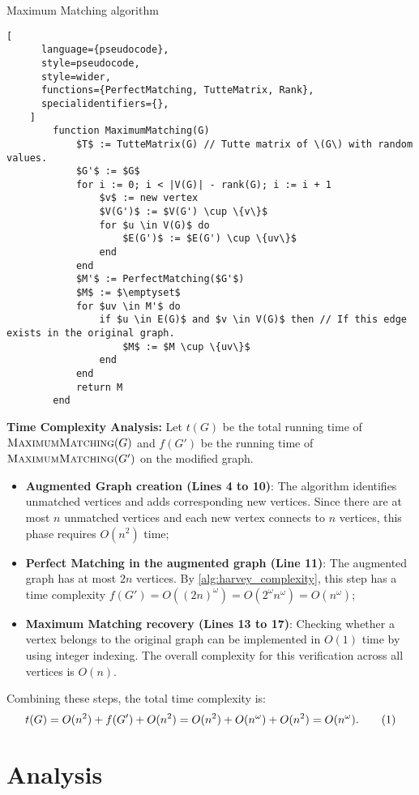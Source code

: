 \begin{programruledcaption}{Maximum Matching algorithm}
    \begin{lstlisting}[
      language={pseudocode},
      style=pseudocode,
      style=wider,
      functions={PerfectMatching, TutteMatrix, Rank},
      specialidentifiers={},
    ]
        function MaximumMatching(G)
            $T$ := TutteMatrix(G) // Tutte matrix of \(G\) with random values.
            $G'$ := $G$
            for i := 0; i < |V(G)| - rank(G); i := i + 1 
                $v$ := new vertex
                $V(G')$ := $V(G') \cup \{v\}$
                for $u \in V(G)$ do 
                    $E(G')$ := $E(G') \cup \{uv\}$
                end
            end
            $M'$ := PerfectMatching($G'$)
            $M$ := $\emptyset$
            for $uv \in M'$ do 
                if $u \in E(G)$ and $v \in V(G)$ then // If this edge exists in the original graph.
                    $M$ := $M \cup \{uv\}$
                end
            end
            return M
        end
    \end{lstlisting}
\end{programruledcaption}
\noindent
\textbf{Time Complexity Analysis:} Let \(t(G)\) be the total running time of \(\textsc{MaximumMatching}(G)\) and \(f(G')\) be the running time of \(\textsc{MaximumMatching}(G')\) on the modified graph.
\begin{itemize}
\item \textbf{Augmented Graph creation (Lines 4 to 10)}:
The algorithm identifies unmatched vertices and adds corresponding new vertices. 
Since there are at most \(n\) unmatched vertices and each new vertex connects to \(n\) vertices, this phase requires \(O(n^2)\) time;

\item \textbf{Perfect Matching in the augmented graph (Line 11)}: 
The augmented graph has at most \(2n\) vertices. 
By \cref{alg:harvey_complexity}, this step has a time complexity  \(f(G') = O((2n)^\omega) = O(2^\omega n^\omega) = O(n^\omega)\);

\item \textbf{Maximum Matching recovery (Lines 13 to 17)}: 
Checking whether a vertex belongs to the original graph can be implemented in \(O(1)\) time by using integer indexing. 
The overall complexity for this verification across all vertices is \(O(n)\).
\end{itemize}
Combining these steps, the total time complexity is:
\[
t(G) = O(n^2) + f(G') + O(n^2) = O(n^2) + O(n^\omega) + O(n^2) = O(n^\omega). \numberthis \label{alg:maximum_matching_complexity}
\]

\section{Analysis}